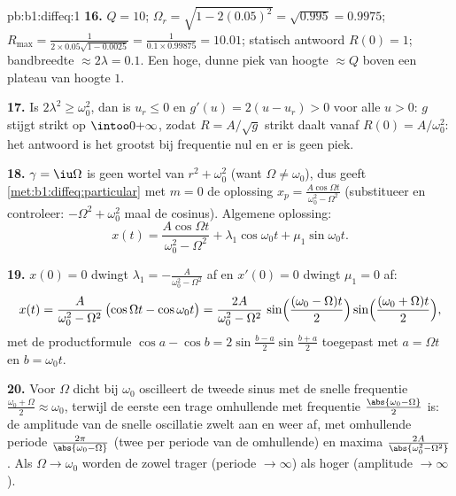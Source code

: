 \begin{solution}{pb:b1:diffeq:1}
\textbf{16.} $Q = 10$; $\Omega_r = \sqrt{1 - 2(0.05)^2} = \sqrt{0.995} =
0.9975$; $R_{\max} = \frac1{2 \times 0.05 \sqrt{1 - 0.0025}} = \frac1{0.1
\times 0.99875} = 10.01$; statisch antwoord $R(0) = 1$; bandbreedte
$\approx 2\lambda = 0.1$. Een hoge, dunne piek van hoogte $\approx Q$
boven een plateau van hoogte $1$.

\textbf{17.} Is $2\lambda^2 \geq \omega_0^2$, dan is $u_r \leq 0$ en
$g'(u) = 2(u - u_r) > 0$ voor alle $u > 0$: $g$ stijgt strikt op
$\intoo0{+\infty}$, zodat $R = A/\sqrt g$ strikt daalt vanaf $R(0) =
A/\omega_0^2$: het antwoord is het grootst bij frequentie nul en er is
geen piek.

\textbf{18.} $\gamma = \iu\Omega$ is geen wortel van $r^2 + \omega_0^2$
(want $\Omega \neq \omega_0$), dus geeft
\cref{met:b1:diffeq:particular} met $m = 0$ de oplossing $x_p =
\frac{A\cos\Omega t}{\omega_0^2 - \Omega^2}$ (substitueer en controleer:
$-\Omega^2 + \omega_0^2$ maal de cosinus). Algemene oplossing:
\[
x(t) = \frac{A\cos\Omega t}{\omega_0^2 - \Omega^2}
+ \lambda_1\cos\omega_0 t + \mu_1\sin\omega_0 t .
\]

\textbf{19.} $x(0) = 0$ dwingt $\lambda_1 = -\frac A{\omega_0^2 -
\Omega^2}$ af en $x'(0) = 0$ dwingt $\mu_1 = 0$ af:
\[
x(t) = \frac{A}{\omega_0^2 - \Omega^2}\,
\bigl(\cos\Omega t - \cos\omega_0 t\bigr)
= \frac{2A}{\omega_0^2 - \Omega^2}\,
\sin\Bigl(\frac{(\omega_0 - \Omega)t}2\Bigr)
\sin\Bigl(\frac{(\omega_0 + \Omega)t}2\Bigr) ,
\]
met de productformule $\cos a - \cos b = 2\sin\frac{b - a}2\sin\frac{b +
a}2$ toegepast met $a = \Omega t$ en $b = \omega_0 t$.

\textbf{20.} Voor $\Omega$ dicht bij $\omega_0$ oscilleert de tweede
sinus met de snelle frequentie $\frac{\omega_0 + \Omega}2 \approx
\omega_0$, terwijl de eerste een trage omhullende met frequentie
$\frac{\abs{\omega_0 - \Omega}}2$ is: de amplitude van de snelle
oscillatie zwelt aan en weer af, met omhullende periode
$\frac{2\pi}{\abs{\omega_0 - \Omega}}$ (twee  per periode van de
omhullende) en maxima $\frac{2A}{\abs{\omega_0^2 - \Omega^2}}$. Als
$\Omega \to \omega_0$ worden de  zowel trager (periode $\to
\infty$) als hoger (amplitude $\to \infty$).


\end{solution}
